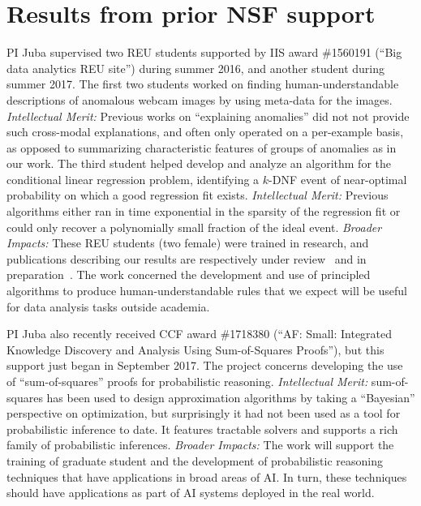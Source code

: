 \documentclass[12pt]{article}
\begin{document}
\section{Results from prior NSF support}
PI Juba supervised two REU students supported by IIS award \#1560191 (``Big data analytics REU site'') during summer 2016, and another student during summer 2017. The first two students worked on finding human-understandable descriptions of anomalous webcam images by using meta-data for the images. {\em Intellectual Merit:} Previous works on ``explaining anomalies'' did not not provide such cross-modal explanations, and often only operated on a per-example basis, as opposed to summarizing characteristic features of groups of anomalies as in our work. The third student helped develop and analyze an algorithm for the conditional linear regression problem, identifying a $k$-DNF event of near-optimal probability on which a good regression fit exists. {\em Intellectual Merit:} Previous algorithms either ran in time exponential in the sparsity of the regression fit or could only recover a polynomially small fraction of the ideal event. {\em Broader Impacts:} These REU students (two female) were trained in research, and publications describing our results are respectively under review~\cite{qi2018} and in preparation~\cite{calderon2018}. The work concerned the development and use of principled algorithms to produce human-understandable rules that we expect will be useful for data analysis tasks outside academia. 

PI Juba also recently received CCF award \#1718380 (``AF: Small: Integrated Knowledge Discovery and Analysis Using Sum-of-Squares Proofs''), but this support just began in September 2017. The project concerns developing the use of ``sum-of-squares'' proofs for probabilistic reasoning. {\em Intellectual Merit:} sum-of-squares has been used to design approximation algorithms by taking a ``Bayesian'' perspective on optimization, but surprisingly it had not been used as a tool for probabilistic inference to date. It features tractable solvers and supports a rich family of probabilistic inferences. {\em Broader Impacts:} The work will support the training of graduate student and the development of probabilistic reasoning techniques that have applications in broad areas of AI. In turn, these techniques should have applications as part of AI systems deployed in the real world.

\pagebreak



\newpage
\end{document}
